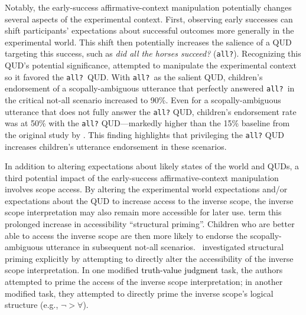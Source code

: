 \documentclass[cm]{glossa}
\newcommand{\lp}[1]{\textcolor{black}{#1}} %
\begin{document}
Notably, the early-success affirmative-context manipulation  potentially changes several aspects of the experimental context.  First, observing early successes can shift participants' expectations about successful outcomes more generally in the experimental world. This shift then potentially increases the salience of a QUD targeting this success, such as \textit{did all the horses succeed?} (\texttt{all?}). Recognizing this QUD's potential significance, \cite{gualmini2004some} attempted to manipulate the experimental context so it favored the \texttt{all?}~QUD. With \texttt{all?}~as the salient QUD, children's endorsement of a scopally-ambiguous utterance that perfectly answered \texttt{all?}~in the critical not-all scenario increased to 90\%.  Even for a scopally-ambiguous utterance that does not fully answer the \texttt{all?} QUD, children's endorsement rate was at 50\% with the \texttt{all?} QUD---markedly higher than the 15\% baseline from the original study by \cite{musolinolidz2006}. This finding highlights that privileging the \texttt{all?} QUD increases children's utterance endorsement in these scenarios.
 
In addition to altering expectations about likely states of the world and QUDs, a third potential impact of the early-success affirmative-context manipulation involves scope access. By  altering the experimental world expectations and/or expectations about the QUD to increase access to the inverse scope, the inverse scope interpretation may also remain more accessible for later use.  \cite{viauetal2010} term this prolonged increase in accessibility ``structural priming''.  Children who are better able to access the inverse scope are then more likely to endorse the scopally-ambiguous utterance in subsequent {not-all} scenarios. \citeauthor{viauetal2010}~investigated structural priming explicitly by attempting to directly alter the accessibility of the inverse scope interpretation. In one modified 
\lp{truth-value judgment}
task, the authors attempted to prime the access of the inverse scope interpretation; in another modified task, they attempted to directly prime the inverse scope's logical structure (e.g., $\neg>\forall$).
\end{document}
